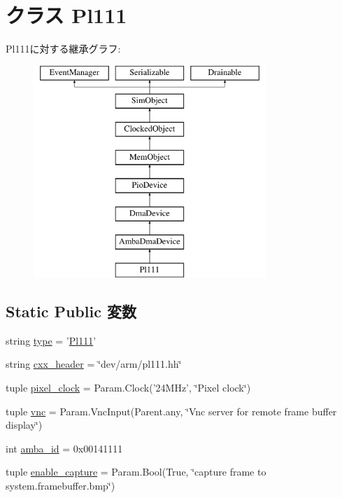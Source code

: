 \hypertarget{classRealView_1_1Pl111}{
\section{クラス Pl111}
\label{classRealView_1_1Pl111}
}
Pl111に対する継承グラフ:\begin{figure}[H]
\begin{center}
\leavevmode
\includegraphics[height=8cm]{classRealView_1_1Pl111}
\end{center}
\end{figure}
\subsection*{Static Public 変数}
\begin{DoxyCompactItemize}
\item 
string \hyperlink{classRealView_1_1Pl111_acce15679d830831b0bbe8ebc2a60b2ca}{type} = '\hyperlink{classRealView_1_1Pl111}{Pl111}'
\item 
string \hyperlink{classRealView_1_1Pl111_a17da7064bc5c518791f0c891eff05fda}{cxx\_\-header} = \char`\"{}dev/arm/pl111.hh\char`\"{}
\item 
tuple \hyperlink{classRealView_1_1Pl111_a1c05724bfa7560d233706f5367017198}{pixel\_\-clock} = Param.Clock('24MHz', \char`\"{}Pixel clock\char`\"{})
\item 
tuple \hyperlink{classRealView_1_1Pl111_afe937f4b2d4f6f3abce13db1d308617d}{vnc} = Param.VncInput(Parent.any, \char`\"{}Vnc server for remote frame buffer display\char`\"{})
\item 
int \hyperlink{classRealView_1_1Pl111_a38d7b9edfe6f0eea7a54e7e4f6253f3a}{amba\_\-id} = 0x00141111
\item 
tuple \hyperlink{classRealView_1_1Pl111_ad54ef6219008e06976486cb101465f9d}{enable\_\-capture} = Param.Bool(True, \char`\"{}capture frame to system.framebuffer.bmp\char`\"{})
\end{DoxyCompactItemize}


